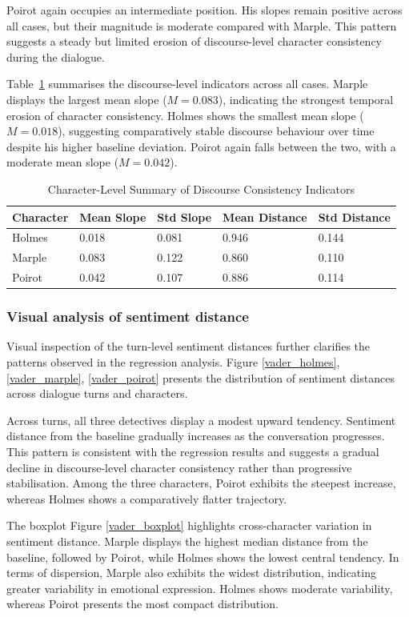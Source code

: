 \documentclass{article}
\begin{document}
Poirot again occupies an intermediate position. His slopes remain positive across all cases, but their magnitude is moderate compared with Marple. This pattern suggests a steady but limited erosion of discourse-level character consistency during the dialogue.

Table~\ref{sentiment_char} summarises the discourse-level indicators across all cases. Marple displays the largest mean slope ($M=0.083$), indicating the strongest temporal erosion of character consistency. Holmes shows the smallest mean slope ($M=0.018$), suggesting comparatively stable discourse behaviour over time despite his higher baseline deviation. Poirot again falls between the two, with a moderate mean slope ($M=0.042$).

\begin{table}[H]
\centering
\begin{tabular}{l l l l l}\toprule
Character & Mean Slope & Std Slope & Mean Distance & Std Distance \\\midrule
Holmes & 0.018 & 0.081 & 0.946 & 0.144 \\
Marple & 0.083 & 0.122 & 0.860 & 0.110 \\
Poirot & 0.042 & 0.107 & 0.886 & 0.114 \\ \bottomrule
\end{tabular}
\caption{Character-Level Summary of Discourse Consistency Indicators}
\label{sentiment_char}
\end{table}

\subsubsection{Visual analysis of sentiment distance}


Visual inspection of the turn-level sentiment distances further clarifies the patterns observed in the regression analysis. Figure \ref{vader_holmes}, \ref{vader_marple}, \ref{vader_poirot} presents the distribution of sentiment distances across dialogue turns and characters.

Across turns, all three detectives display a modest upward tendency. Sentiment distance from the baseline gradually increases as the conversation progresses. This pattern is consistent with the regression results and suggests a gradual decline in discourse-level character consistency rather than progressive stabilisation. Among the three characters, Poirot exhibits the steepest increase, whereas Holmes shows a comparatively flatter trajectory.

The boxplot Figure \ref{vader_boxplot} highlights cross-character variation in sentiment distance. Marple displays the highest median distance from the baseline, followed by Poirot, while Holmes shows the lowest central tendency. In terms of dispersion, Marple also exhibits the widest distribution, indicating greater variability in emotional expression. Holmes shows moderate variability, whereas Poirot presents the most compact distribution.
\end{document}
